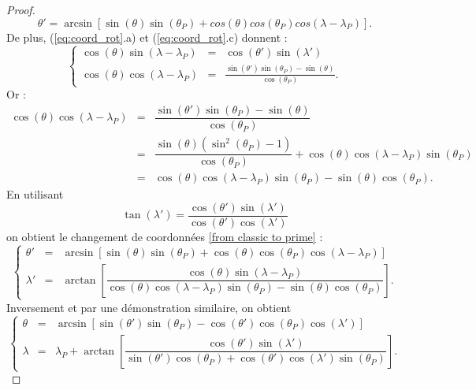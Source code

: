\begin{proof}
\begin{equation}
\theta' = \arcsin \left[ \sin( \theta) \sin(\theta_P) + cos( \theta ) cos( \theta_P) cos( \lambda - \lambda_P ) \right] .
\end{equation}
De plus, (\ref{eq:coord_rot}.a) et (\ref{eq:coord_rot}.c) donnent :
\begin{equation}
\left\lbrace 
\begin{array}{rcl}
\cos( \theta ) \sin( \lambda - \lambda_P) & = & \cos( \theta' ) \sin( \lambda' ) \\
\cos( \theta ) \cos( \lambda - \lambda_P) & = & \frac{\sin( \theta' ) \sin ( \theta_P ) - \sin( \theta )}{\cos( \theta_P)}.
\end{array}
\right.
\end{equation}
Or :
\begin{equation*}
\begin{array}{rcl}
\cos( \theta ) \cos( \lambda - \lambda_P) & = & \dfrac{\sin( \theta' ) \sin ( \theta_P ) - \sin( \theta )}{\cos( \theta_P)} \\
 & = & \dfrac{\sin( \theta) (\sin^2 ( \theta_P) -1 )}{\cos( \theta_P)} + \cos( \theta ) \cos( \lambda- \lambda_P) \sin( \theta_P)\\
 & = & \cos ( \theta) \cos( \lambda - \lambda_P) \sin( \theta_P ) - \sin( \theta) \cos ( \theta_P ).
\end{array}
\end{equation*}
En utilisant 
\begin{equation}
\tan ( \lambda' ) =  \dfrac{\cos( \theta' ) \sin(  \lambda' ) }{\cos( \theta' ) \cos(  \lambda' )}
\end{equation}
on obtient le changement de coordonnées \eqref{from classic to prime} :
\begin{equation}
\left\lbrace 
\begin{array}{rcl}
\theta' & = & \arcsin \left[ \sin( \theta) \sin(\theta_P) + \cos( \theta ) \cos( \theta_P) \cos( \lambda - \lambda_P ) \right] \\
\lambda' & = & \arctan \left[ \dfrac{\cos ( \theta) \sin( \lambda - \lambda_P)}{\cos( \theta) \cos( \lambda - \lambda_P) \sin( \theta_P) - \sin( \theta) \cos( \theta_P)} \right].
\end{array}
\right.
\end{equation}
Inversement et par une démonstration similaire, on obtient
\begin{equation}
\left\lbrace 
\begin{array}{rcl}
\theta & = & \arcsin \left[ \sin( \theta') \sin(\theta_P) - \cos( \theta' ) \cos( \theta_P) \cos( \lambda' ) \right] \\
\lambda & = & \lambda_P + \arctan \left[ \dfrac{\cos ( \theta') \sin( \lambda ')}{\sin( \theta') \cos( \theta_P) + \cos ( \theta') \cos( \lambda') \sin ( \theta_P)} \right].
\end{array}
\right.
\end{equation}
\end{proof}

